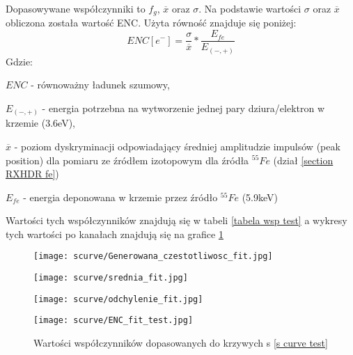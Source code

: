 Dopasowywane współczynniki to $f_g$, $\overline{x}$ oraz $\sigma$. Na podstawie wartości $\sigma$ oraz $\overline{x}$ obliczona została wartość ENC. Użyta równość znajduje się poniżej:
\begin{equation}
        ENC [e^-] = \frac{\sigma}{\overline{x}} * \frac{E_{fe}}{E_{(-,+)}}
\end{equation}
Gdzie:
\begin{description}
        \item $ENC$  - równoważny ładunek szumowy,
        \item $E_{(-,+)}$ - energia potrzebna na wytworzenie jednej pary dziura/elektron w krzemie (3.6eV),
        \item $\overline{x}$ - poziom dyskryminacji odpowiadający średniej amplitudzie impulsów (peak position) dla pomiaru ze źródłem izotopowym dla źródła ${}^{55}Fe$ (dział \ref{section RXHDR fe})
        \item $E_{fe}$ -  energia deponowana w krzemie przez źródło ${}^{55}Fe$  (5.9keV)
\end{description}

Wartości tych współczynników znajdują się w tabeli \ref{tabela wsp test} a wykresy tych wartości po kanałach znajdują się na grafice \ref{test fit wsp wyk} 

\begin{figure}
        \begin{multicols}{2}
                \texttt{[image: scurve/Generowana\_czestotliwosc\_fit.jpg]} \par
                \texttt{[image: scurve/srednia\_fit.jpg]} \par       
        \end{multicols} \hfill
        \begin{multicols}{2}
                \texttt{[image: scurve/odchylenie\_fit.jpg]} \par
                \texttt{[image: scurve/ENC\_fit\_test.jpg]} \par
        \end{multicols}
        \caption{Wartości współczynników dopasowanych do krzywych s \ref{s curve test}}
        \label{test fit wsp wyk}
\end{figure}


